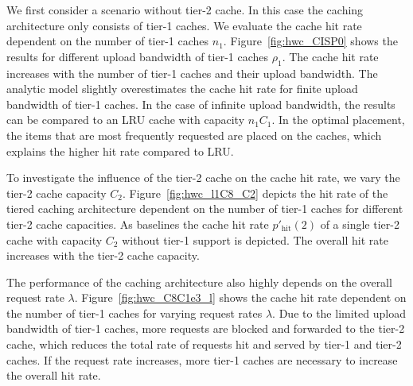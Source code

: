 We first consider a scenario without tier-2 cache.
In this case the caching architecture only consists of tier-1 caches.
We evaluate the cache hit rate dependent on the number of tier-1 caches $n_1$.
Figure~\ref{fig:hwc_CISP0} shows the results for different upload bandwidth of tier-1 caches $\rho_1$.
The cache hit rate increases with the number of tier-1 caches and their upload bandwidth.
The analytic model slightly overestimates the cache hit rate for finite upload bandwidth of tier-1 caches.
In the case of infinite upload bandwidth, the results can be compared to an LRU cache with capacity $n_1 C_1$.
In the optimal placement, the items that are most frequently requested are placed on the caches, which explains the higher hit rate compared to LRU.



To investigate the influence of the tier-2 cache on the cache hit rate, we vary the tier-2 cache capacity $C_2$.
Figure~\ref{fig:hwc_l1C8_C2} depicts the hit rate of the tiered caching architecture dependent on the number of tier-1 caches for different tier-2 cache capacities.
As baselines the cache hit rate $p'_\text{hit}(2)$ of a single tier-2 cache with capacity $C_2$ without tier-1 support is depicted.
The overall hit rate increases with the tier-2 cache capacity.

The performance of the caching architecture also highly depends on the overall request rate $\lambda$.
Figure~\ref{fig:hwc_C8C1e3_l} shows the cache hit rate dependent on the number of tier-1 caches for varying request rates $\lambda$.
Due to the limited upload bandwidth of tier-1 caches, more requests are blocked and forwarded to the tier-2 cache, which reduces the total rate of requests hit and served by tier-1 and tier-2 caches.
If the request rate increases, more tier-1 caches are necessary to increase the overall hit rate.


